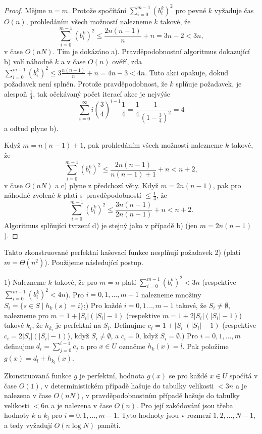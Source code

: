 \documentclass[a4paper,12pt]{article}
\begin{document}
\begin{proof}Mějme $n=m$. Protože spočítání 
$\sum_{i=0}^{m-1}(b_i^k)^2$ pro pevné $k$ vyžaduje čas $O
(n)$, prohledáním 
všech možností nalez\-ne\-me $k$ takové, že 
$$\sum_{i=0}^{m-1}(b_i^k)^2\le\frac {2n(n-1)}n+n=3n-2<3n,$$
v čase $O(nN)$. Tím je 
dokázáno a). Pravděpodobnostní algoritmus dokazující b) volí 
náhodně $k$ a v čase $O(n)$ ověří, zda 
$\sum_{i=0}^{m-1}(b_i^k)^2\le 3\frac {n(n-1)}n+n=4n-3<4n$. Tuto akci opakuje, dokud 
požadavek není splněn. Protože pravděpodobnost, že $
k$ splňuje 
požadavek, je alespoň $\frac 14$, tak očekávaný počet ite\-rací 
akce je nejvýše 
$$\sum_{i=0}^{\infty}i(\frac 34)^{i-1}\frac 14=\frac 14\frac 1{(1
-\frac 34)^2}=4$$
a odtud plyne b). 

Když $m=n(n-1)+1$, pak prohledáním všech možností 
nalezne\-me $k$ takové, že 
$$\sum_{i=0}^{m-1}(b_i^k)^2\le\frac {2n(n-1)}{n(n-1)+1}+n<n+2,$$
 v 
čase $O(nN)$ a c) plyne z předchozí věty. Když 
$m=2n(n-1)$, pak pro náhodně zvolené $k$ platí s~pravděpodobností $\le\frac 14$, že 
$$\sum_{i=0}^{m-1}(b_i^k)^2\le\frac {3n(n-1)}{2n(n-1)}+n<n+2.$$
Algoritmus splňující tvrzení d) je stejný jako 
v případě b) (jen $m=2n(n-1)$).
\end{proof}

Takto zkonstruované perfektní hašovací funkce 
nesplňují poža\-davek 2) (platí $m=\Theta (n^2)$).  Použijeme následující 
postup. 

1) Nalezneme $k$ takové, že pro $m=n$ platí 
$\sum_{i=0}^{m-1}(b_i^k)^2<3n$ (respektive $\sum_{i=0}^{m-1}(b_i^
k)^2<4n$).  Pro 
$i=0,1,\dots,m-1$ nalezneme množiny 
$S_i=\{s\in S\mid h_k(s)=i\}$;) Pro každé $i=0,1\dots,m-1$ takové, že $S_i\ne\emptyset$, 
nalezneme pro $m=1+|S_i|(|S_i|-1)$ (respektive $m=1+2|S_i|(|S_i|-
1)$) 
takové $k_i$, že $h_{k_i}$ je perfektní na $S_i$. Definujme 
$c_i=1+|S_i|(|S_i|-1)$ (respektive $c_i=2|S_i|(|S_i|-1)$), když 
$S_i\ne\emptyset$, a $c_i=0$, když 
$S_i=\emptyset$.) Pro $i=0,1,\dots,m$ definujme $d_i=\sum_{j=0}^{i-1}c_j$ a pro $
x\in U$ 
označme $h_k(x)=l$. Pak položíme $g(x)=d_l+h_{k_l}(x)$.

\begin{veta}Zkonstruovaná funkce $g$ je perfektní, 
hodnota $g(x)$ se pro každé $x\in U$ spočítá v čase $
O(1)$, 
v deterministickém přípa\-dě hašuje do tabulky velikosti 
$<3n$ a je nalezena v čase $O(nN)$, v pravděpodobnostním 
přípa\-dě hašuje do tabulky velikosti $<6n$ a je nalezena 
v čase $O(n)$. Pro její zakódování jsou třeba hodnoty $
k$ a 
$k_i$ pro $i=0,1,\dots,m-1$. Tyto hodnoty jsou v rozmezí 
$1,2,\dots,N-1$, a tedy vyžadují $O(n\log N)$ paměti.
\end{veta}
\end{document}
